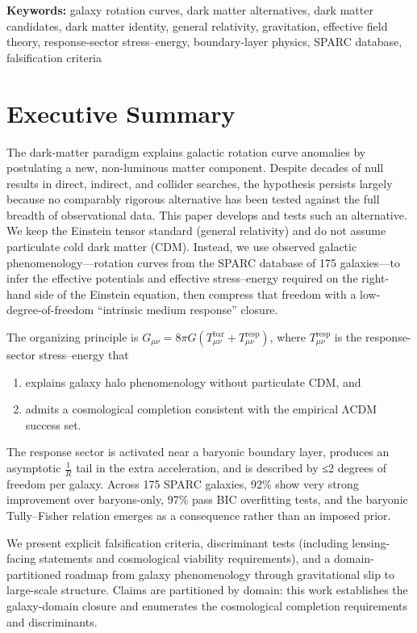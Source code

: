\documentclass[11pt]{article}
\begin{document}
\noindent\textbf{Keywords:} galaxy rotation curves, dark matter alternatives, dark matter candidates, dark matter identity, general relativity, gravitation, effective field theory, response-sector stress--energy, boundary-layer physics, SPARC database, falsification criteria

\section*{Executive Summary}

The dark-matter paradigm explains galactic rotation curve anomalies by postulating a new, non-luminous matter component. Despite decades of null results in direct, indirect, and collider searches, the hypothesis persists largely because no comparably rigorous alternative has been tested against the full breadth of observational data. This paper develops and tests such an alternative. We keep the Einstein tensor standard (general relativity) and do not assume particulate cold dark matter (CDM). Instead, we use observed galactic phenomenology---rotation curves from the SPARC database of 175 galaxies---to infer the effective potentials and effective stress--energy required on the right-hand side of the Einstein equation, then compress that freedom with a low-degree-of-freedom ``intrinsic medium response'' closure.

The organizing principle is \(G_{\mu\nu} = 8\pi G\left( T_{\mu\nu}^{\text{bar}} + T_{\mu\nu}^{\text{resp}} \right)\), where \(T_{\mu\nu}^{\text{resp}}\) is the response-sector stress--energy that

\begin{enumerate}
\def\labelenumi{(\roman{enumi})}
\item
  explains galaxy halo phenomenology without particulate CDM, and
\item
  admits a cosmological completion consistent with the empirical ΛCDM success set.
\end{enumerate}

The response sector is activated near a baryonic boundary layer, produces an asymptotic \(\frac{1}{R}\) tail in the extra acceleration, and is described by ≤2 degrees of freedom per galaxy. Across 175 SPARC galaxies, 92\% show very strong improvement over baryons-only, 97\% pass BIC overfitting tests, and the baryonic Tully--Fisher relation emerges as a consequence rather than an imposed prior.

We present explicit falsification criteria, discriminant tests (including lensing-facing statements and cosmological viability requirements), and a domain-partitioned roadmap from galaxy phenomenology through gravitational slip to large-scale structure. Claims are partitioned by domain: this work establishes the galaxy-domain closure and enumerates the cosmological completion requirements and discriminants.
\end{document}
